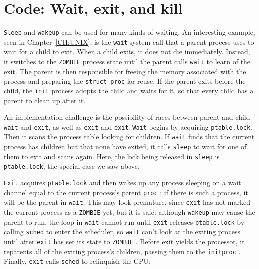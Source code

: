 \section{Code: Wait, exit, and kill}
\lstinline{Sleep}
and
\lstinline{wakeup}
can be used for many kinds of waiting.
An interesting example, seen in Chapter~\ref{CH:UNIX},
is the
\lstinline{wait}
system call that a parent process uses to wait for a child to exit.
When a child exits, it does not die immediately.
Instead, it switches to the
\lstinline{ZOMBIE}
process state until the parent calls
\lstinline{wait}
to learn of the exit.
The parent is then responsible for freeing the
memory associated with the process 
and preparing the
\lstinline{struct proc}
for reuse.
If the parent exits before the child, the 
\lstinline{init}
process
adopts the child and waits for it, so that
every child has a parent to clean up after it.

An implementation challenge is
the possibility of races between
parent and child
\lstinline{wait}
and
\lstinline{exit},
as well as
\lstinline{exit}
and
\lstinline{exit}.
\lstinline{Wait}
begins by
acquiring 
\lstinline{ptable.lock}.
Then it scans the process table
looking for children.
If 
\lstinline{wait}
finds that the current process has children
but that none have exited,
it calls
\lstinline{sleep}
to wait for one of them to exit
and scans again.
Here,
the lock being released in 
\lstinline{sleep}
is
\lstinline{ptable.lock},
the special case we saw above.

\lstinline{Exit}
acquires
\lstinline{ptable.lock}
and then wakes up any process sleeping on a wait
channel equal to the current process's parent
\lstinline{proc}
;
if there is such a process, it will be the parent in
\lstinline{wait}.
This may look premature, since 
\lstinline{exit}
has not marked the current process as a
\lstinline{ZOMBIE}
yet, but it is safe:
although
\lstinline{wakeup}
may cause the parent to run,
the loop in
\lstinline{wait}
cannot run until
\lstinline{exit}
releases 
\lstinline{ptable.lock}
by calling
\lstinline{sched}
to enter the scheduler,
so
\lstinline{wait}
can't look at
the exiting process until after
\lstinline{exit}
has set its state to
\lstinline{ZOMBIE}
.
Before exit yields the processor,
it reparents all of
the exiting process's children,
passing them to the
\lstinline{initproc}
.
Finally,
\lstinline{exit}
calls
\lstinline{sched}
to relinquish the CPU.

